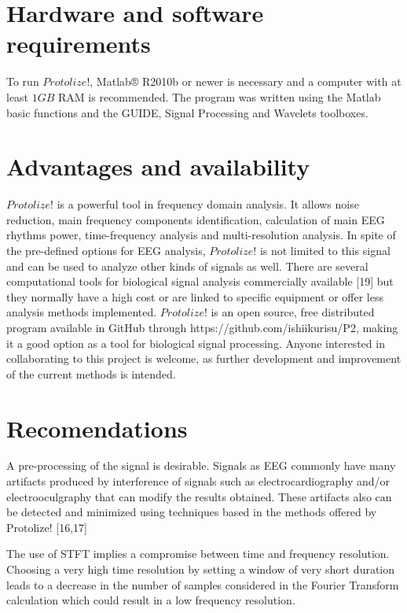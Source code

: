 \documentclass[12pt, a4paper]{article}
\begin{document}
\section{Hardware and software requirements}

To run $Protolize!$, Matlab® R2010b or newer is necessary and a computer with at least $1GB$ RAM is recommended. The program was written using the Matlab basic functions and the GUIDE, Signal Processing and Wavelets toolboxes.

\section{Advantages and availability}

$Protolize!$ is a powerful tool in frequency domain analysis. It allows noise reduction, main frequency components identification, calculation of main EEG rhythms power, time-frequency analysis and multi-resolution analysis. In spite of the pre-defined options for EEG analysis, $Protolize!$ is not limited to this signal and can be used to analyze other kinds of signals as well. There are several computational tools for biological signal analysis commercially available [19] but they normally have a high cost or are linked to specific equipment or offer less analysis methods implemented. $Protolize!$ is an open source, free distributed program available in GitHub through https://github.com/ishiikurisu/P2, making it a good option as a tool for biological signal processing. Anyone interested in collaborating to this project is welcome, as further development and improvement of the current methods is intended.

\section{Recomendations}

A pre-processing of the signal is desirable. Signals as EEG commonly have many artifacts produced by interference of signals such as electrocardiography and/or electrooculgraphy that can modify the results obtained. These artifacts also can be detected and minimized using techniques based in the methods offered by Protolize! [16,17]

The use of STFT implies a compromise between time and frequency resolution. Choosing a very high time resolution by setting a window of very short duration leads to a decrease in the number of samples considered in the Fourier Transform calculation which could result in a low frequency resolution.
\end{document}

